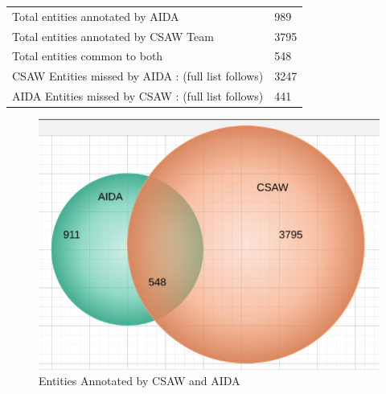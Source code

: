 \documentclass[a4paper,10pt]{article}
\begin{document}
\begin{center}
\bigskip \bigskip \bigskip \bigskip

\begin{tabular}{|l|l|}
 \hline
Total entities annotated by AIDA & 989\\ 
Total entities annotated by CSAW Team & 3795\\ 
Total entities common to both & 548\\ 
CSAW Entities missed by AIDA : (full list follows)  & 3247\\ 
AIDA Entities missed by CSAW : (full list follows)  & 441\\ 
\hline
\end{tabular}
\end{center}
\bigskip
\begin{center}
 \begin{figure}[h]
 \centering
 \includegraphics[bb=0 0 674 495,scale=0.3]{./venn.png}
 \caption{Entities Annotated by CSAW and AIDA}
\end{figure}

\end{center}
\end{document}
